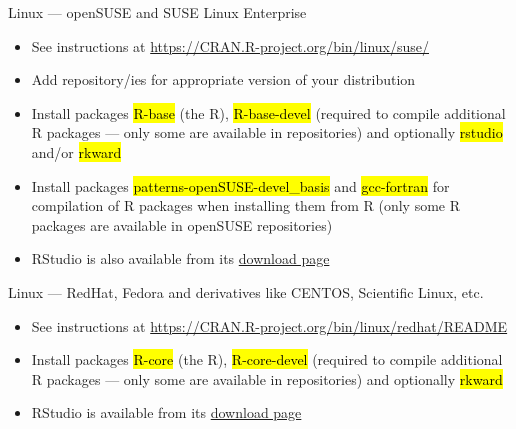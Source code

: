\documentclass[compress, ucs, xelatex, 11pt, xcolor=svgnames,
	hyperref={
		bookmarks=true,
		unicode=true,
		colorlinks=true,
		pdftitle={Molecular data in R},
		plainpages=false,
		pdfauthor={Vojtech Zeisek},
		pdfsubject={Course about phylogeny and evolution in R},
		pdfcreator={XeLaTeX},
		pdfkeywords={R, evolution, phylogeny, molecular data},
		linkcolor=Tomato,
		anchorcolor=SaddleBrown,
		citecolor=Goldenrod,
		filecolor=DarkMagenta,
		menucolor=Sienna,
		urlcolor=DarkTurquoise,
		pdftex},
	url={hyphens, lowtilde} %
	]{beamer}
\renewcommand{\texttt}[1]{\hl{\ttfamily #1}}
\begin{document}
\begin{frame}{Linux --- openSUSE and SUSE Linux Enterprise}
	\begin{itemize}
		\item See instructions at \url{https://CRAN.R-project.org/bin/linux/suse/}
		\item Add repository/ies for appropriate version of your distribution
		\begin{itemize}
		\end{itemize}
		\item Install packages \texttt{R-base} (the R), \texttt{R-base-devel} (required to compile additional R packages --- only some are available in repositories) and optionally \texttt{rstudio} and/or \texttt{rkward}
		\item Install packages \texttt{patterns-openSUSE-devel\_basis} and \texttt{gcc-fortran} for compilation of R packages when installing them from R (only some R packages are available in openSUSE repositories)
		\item RStudio is also available from its \href{https://www.rstudio.com/products/rstudio/download/\#download}{download page}
	\end{itemize}
\end{frame}

\begin{frame}{Linux --- RedHat, Fedora and derivatives like CENTOS, Scientific Linux, etc.}
	\begin{itemize}
		\item See instructions at \url{https://CRAN.R-project.org/bin/linux/redhat/README}
		\item Install packages \texttt{R-core} (the R), \texttt{R-core-devel} (required to compile additional R packages --- only some are available in repositories) and optionally \texttt{rkward}
		\item RStudio is available from its \href{https://www.rstudio.com/products/rstudio/download/\#download}{download page}
	\end{itemize}
\end{frame}
\end{document}
